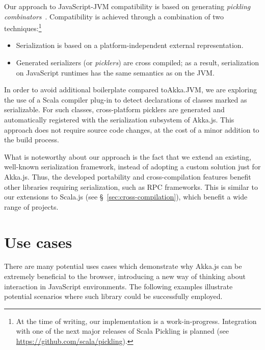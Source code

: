 \documentclass{sig-alternate}
\begin{document}
Our approach to JavaScript-JVM compatibility is based on generating {\em pickling
combinators}~\cite{MillerHBO13}. Compatibility is achieved through a combination of two
techniques:\footnote{At the time of writing, our implementation is a work-in-progress.
Integration with one of the next major releases of Scala Pickling is planned (see
\url{https://github.com/scala/pickling}).}
\begin{itemize}
\item Serialization is based on a platform-independent external representation.
\item Generated serializers (or {\em picklers}) are cross compiled; as a result,
      serialization on JavaScript runtimes has the same semantics as on the JVM.
\end{itemize}

In order to avoid additional boilerplate compared to\newline Akka.JVM, we are exploring
the use of a Scala compiler plug-in to detect declarations of classes
marked as serializable. For such classes, cross-platform picklers are generated
and automatically registered with the serialization subsystem of Akka.js.
This approach does not require source code changes, at the cost of a minor addition
to the build process.

What is noteworthy about our approach is the fact that we extend an existing,
well-known serialization framework, instead of adopting a custom solution just
for Akka.js. Thus, the developed portability and cross-compilation features benefit other
libraries requiring serialization, such as RPC frameworks. This is similar to
our extensions to Scala.js (see \S~\ref{sec:cross-compilation}), which benefit
a wide range of projects.


\section{Use cases}\label{sec:usecases}

There are many potential uses cases which demonstrate why Akka.js can be extremely beneficial to the browser, introducing a new way of thinking about interaction in JavaScript environments. The following examples illustrate
potential scenarios where such library could be successfully employed.
\end{document}
